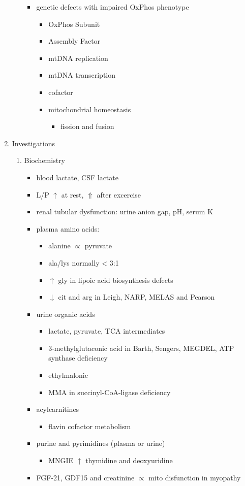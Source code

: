 \documentclass{scrartcl}
\begin{document}
\begin{enumerate}
\begin{enumerate}
\begin{itemize}
\item genetic defects with impaired OxPhos phenotype 
\begin{itemize}
\item OxPhos Subunit
\item Assembly Factor
\item mtDNA replication
\item mtDNA transcription
\item cofactor
\item mitochondrial homeostasis
\begin{itemize}
\item fission and fusion
\end{itemize}
\end{itemize}
\end{itemize}
\end{enumerate}
\item Investigations
\label{sec:org84a9353}
\begin{enumerate}
\item Biochemistry
\label{sec:org3eefee9}
\begin{itemize}
\item blood lactate, CSF lactate
\item L/P \(\uparrow\) at rest, \(\Uparrow\) after excercise
\item renal tubular dysfunction: urine anion gap, pH, serum K
\item plasma amino acids:
\begin{itemize}
\item alanine \(\propto\) pyruvate
\item ala/lys normally \textless{} 3:1
\item \(\uparrow\) gly in lipoic acid biosynthesis defects
\item \(\downarrow\) cit and arg in Leigh, NARP, MELAS and Pearson
\end{itemize}
\item urine organic acids
\begin{itemize}
\item lactate, pyruvate, TCA intermediates
\item 3-methylglutaconic acid in Barth, Sengers, MEGDEL, ATP synthase deficiency
\item ethylmalonic
\item MMA in succinyl-CoA-ligase deficiency
\end{itemize}
\item acylcarnitines
\begin{itemize}
\item flavin cofactor metabolism
\end{itemize}
\item purine and pyrimidines (plasma or urine)
\begin{itemize}
\item MNGIE \(\uparrow\) thymidine and deoxyuridine
\end{itemize}
\item FGF-21, GDF15 and creatinine \(\propto\) mito disfunction in myopathy
\end{itemize}


\end{enumerate}
\end{enumerate}
\end{document}

